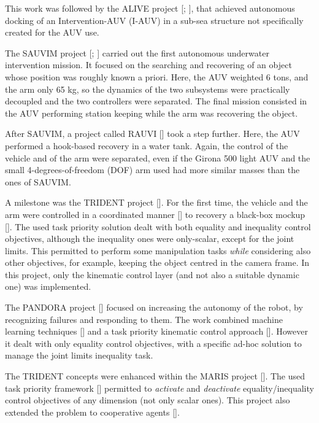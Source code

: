 This work was followed by the ALIVE project [\cite{IntroAlive1}; \cite{IntroAlive2}], that achieved autonomous docking of an Intervention-AUV (I-AUV) in a sub-sea structure not specifically created for the AUV use.

The SAUVIM project [\cite{IntroSauvim1}; \cite{IntroSauvim2}] carried out the first autonomous underwater intervention mission. It focused on the searching and recovering of an object whose position was roughly known a priori. Here, the AUV weighted 6 tons, and the arm only 65 kg, so the dynamics of the two subsystems were practically decoupled and the two controllers were separated. The final mission consisted in the AUV performing station keeping while the arm was recovering the object.

After SAUVIM, a project called RAUVI [\cite{IntroRauvi}] took a step further. Here, the AUV performed a hook-based recovery in a water tank. Again, the control of the vehicle and of the arm were separated, even if the Girona 500 light AUV and the small 4-degrees-of-freedom (DOF) arm used had more similar masses than the ones of SAUVIM.

A milestone was the TRIDENT project [\cite{IntroTrident1}]. For the first time, the vehicle and the arm were controlled in a coordinated manner [\cite{IntroTrident2}] to recovery a black-box mockup [\cite{IntroTrident4}]. The used task priority solution dealt with both equality and inequality control objectives, although the inequality ones were only-scalar, except for the joint limits. This permitted to perform some manipulation tasks \textit{while} considering also other objectives, for example, keeping the object centred in the camera frame. In this project, only the kinematic control layer (and not also a suitable dynamic one) was implemented.

The PANDORA project [\cite{IntroPandora1}] focused on increasing the autonomy of the robot, by recognizing failures and responding to them. The work combined machine learning techniques [\cite{IntroPandora2}] and a task priority kinematic control approach [\cite{IntroPandora3}]. However it dealt with only equality control objectives, with a specific ad-hoc solution to manage the joint limits inequality task.

The TRIDENT concepts were enhanced within the MARIS project [\cite{IntroMaris0}]. The used task priority framework [\cite{IntroMaris1}] permitted to \textit{activate} and \textit{deactivate} equality/inequality control objectives of any dimension (not only scalar ones). This project also extended the problem to cooperative agents [\cite{IntroMaris2}].

